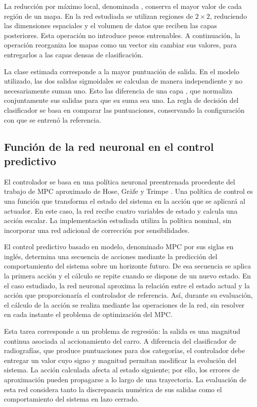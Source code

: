 La reducción por máximo local, denominada , conserva el mayor valor de cada región de un mapa. En la red estudiada se utilizan regiones de $2\times2$, reduciendo las dimensiones espaciales y el volumen de datos que reciben las capas posteriores. Esta operación no introduce pesos entrenables. A continuación, la operación  reorganiza los mapas como un vector sin cambiar sus valores, para entregarlos a las capas densas de clasificación.

La clase estimada corresponde a la mayor puntuación de salida. En el modelo utilizado, las dos salidas sigmoidales se calculan de manera independiente y no necesariamente suman uno. Esto las diferencia de una capa , que normaliza conjuntamente sus salidas para que su suma sea uno. La regla de decisión del clasificador se basa en comparar las puntuaciones, conservando la configuración con que se entrenó la referencia.

\subsection{Función de la red neuronal en el control predictivo}
El controlador se basa en una política neuronal preentrenada procedente del trabajo de MPC aproximado de Hose, Gräfe y Trimpe \cite{hose2024}. Una política de control es una función que transforma el estado del sistema en la acción que se aplicará al actuador. En este caso, la red recibe cuatro variables de estado y calcula una acción escalar. La implementación estudiada utiliza la política nominal, sin incorporar una red adicional de corrección por sensibilidades.

El control predictivo basado en modelo, denominado MPC por sus siglas en inglés, determina una secuencia de acciones mediante la predicción del comportamiento del sistema sobre un horizonte futuro. De esa secuencia se aplica la primera acción y el cálculo se repite cuando se dispone de un nuevo estado. En el caso estudiado, la red neuronal aproxima la relación entre el estado actual y la acción que proporcionaría el controlador de referencia. Así, durante su evaluación, el cálculo de la acción se realiza mediante las operaciones de la red, sin resolver en cada instante el problema de optimización del MPC.

Esta tarea corresponde a un problema de regresión: la salida es una magnitud continua asociada al accionamiento del carro. A diferencia del clasificador de radiografías, que produce puntuaciones para dos categorías, el controlador debe entregar un valor cuyo signo y magnitud permitan modificar la evolución del sistema. La acción calculada afecta al estado siguiente; por ello, los errores de aproximación pueden propagarse a lo largo de una trayectoria. La evaluación de esta red considera tanto la discrepancia numérica de sus salidas como el comportamiento del sistema en lazo cerrado.


